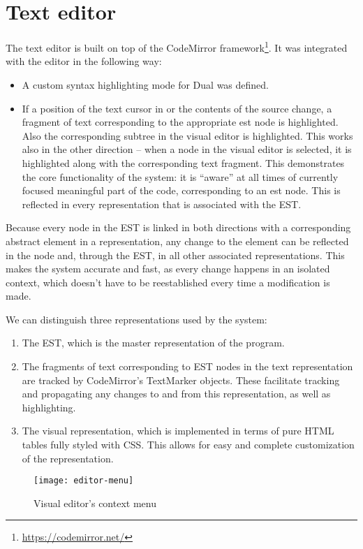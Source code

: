 \section{Text editor}
The text editor is built on top of the CodeMirror framework\footnote{\url{https://codemirror.net/}}. It was integrated with the editor in the following way:
\begin{itemize}
    \item A custom syntax highlighting mode for Dual was defined.
    \item If a position of the text cursor in or the contents of the source change, a fragment of text corresponding to the appropriate \acrshort{est} node is highlighted. Also the corresponding subtree in the visual editor is highlighted. This works also in the other direction -- when a node in the visual editor is selected, it is highlighted along with the corresponding text fragment. This demonstrates the core functionality of the system: it is ``aware'' at all times of currently focused meaningful part of the code, corresponding to an \acrshort{est} node. This is reflected in every representation that is associated with the EST.

\end{itemize}
Because every node in the EST is linked in both directions with a corresponding abstract element in a representation, any change to the element can be reflected in the node and, through the EST, in all other associated representations. This makes the system accurate and fast, as every change happens in an isolated context, which doesn't have to be reestablished every time a modification is made.

We can distinguish three representations used by the system:
\begin{enumerate}
    \item The EST, which is the master representation of the program.
    \item The fragments of text corresponding to EST nodes in the text representation are tracked by CodeMirror's TextMarker objects. These facilitate tracking and propagating any changes to and from this representation, as well as highlighting.
    \item The visual representation, which is implemented in terms of pure HTML tables fully styled with CSS. This allows for easy and complete customization of the representation.
\end{enumerate}

\begin{figure}[h!]
\centering
\texttt{[image: editor-menu]}
\caption{Visual editor's context menu}
\label{fig:editor-menu}
\end{figure}

